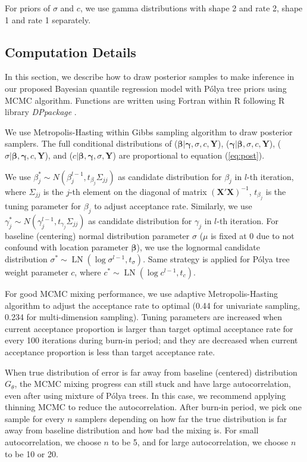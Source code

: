 \documentclass[12pt]{article}
\newcommand{\polya}{P\'{o}lya}
\DeclareMathOperator{\LN}{LN}
\begin{document}
For priors of $\sigma$ and $c$, we use gamma distributions with shape
2 and rate 2, shape 1 and rate 1 separately.

\subsection{Computation Details}\label{sec:computation}

In this section, we describe how to draw posterior samples to make
inference in our proposed Bayesian quantile regression model with
\polya{} tree priors using MCMC algorithm. Functions are written using
Fortran within R \citep{R} following R library \textit{DPpackage}
\citep{DPpackage}.

We use Metropolis-Hasting within Gibbs sampling algorithm to draw
posterior samplers. The full conditional distributions of ($\bm
\beta|\bm \gamma, \sigma, c, \bm Y$), ($\bm \gamma|\bm \beta, \sigma,
c, \bm Y$), ($\sigma|\bm \beta, \bm \gamma, c, \bm Y$), and ($c|\bm
\beta, \bm \gamma, \sigma, \bm Y$) are proportional to equation
(\ref{eq:post}).

We use $\beta_j^* \sim N(\beta_j^{l-1}, t_{\beta_j} \Sigma_{jj})$ as
candidate distribution for $\beta_j$ in $l$-th iteration, where
$\Sigma_{jj}$ is the $j$-th element on the diagonal of matrix
$\bm{(X'X)}^{-1}$, $t_{\beta_j}$ is the tuning parameter for $\beta_j$
to adjust acceptance rate.  Similarly, we use $\gamma_j^* \sim
N(\gamma_j^{l-1}, t_{\gamma_j}\Sigma_{jj})$ as candidate distribution
for $\gamma_j$ in $l$-th iteration.  For baseline (centering) normal
distribution parameter $\sigma$ ($\mu$ is fixed at 0 due to not
confound with location parameter $\bm \beta$), we use the lognormal
candidate distribution $\sigma^* \sim \LN(\log \sigma^{l-1},
t_{\sigma})$.  Same strategy is applied for \polya{} tree weight
parameter $c$, where $c^* \sim \LN(\log c^{l-1}, t_c)$.

For good MCMC mixing performance, we use adaptive Metropolis-Hasting
algorithm to adjust the acceptance rate to optimal (0.44 for
univariate sampling, 0.234 for multi-dimension sampling). Tuning
parameters are increased when current acceptance proportion is larger
than target optimal acceptance rate for every 100 iterations during
burn-in period; and they are decreased when current acceptance
proportion is less than target acceptance rate.

When true distribution of error is far away from baseline (centered)
distribution $G_{\theta}$, the MCMC mixing progress can still stuck
and have large autocorrelation, even after using mixture of \polya{}
trees. In this case, we recommend applying thinning MCMC to reduce the
autocorrelation. After burn-in period, we pick one sample for every
$n$ samplers depending on how far the true distribution is far away
from baseline distribution and how bad the mixing is. For small
autocorrelation, we choose $n$ to be 5, and for large autocorrelation,
we choose $n$ to be 10 or 20.
\end{document}
